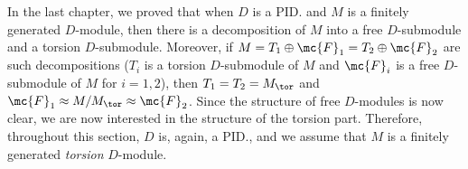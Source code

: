 In the last chapter, we proved that when $D$ is a PID. and $M$ is a finitely generated $D$-module, then there is a decomposition of $M$ into a free $D$-submodule and a torsion $D$-submodule.
Moreover, if $M=T_1\oplus\mc{F}_1=T_2\oplus\mc{F}_2$ are such decompositions ($T_i$ is a torsion $D$-submodule of $M$ and $\mc{F}_i$ is a free $D$-submodule of $M$ for $i=1, 2$), then $T_1=T_2=M_\tor$ and $\mc{F}_1\approx M/M_\tor\approx \mc{F}_2$.
Since the structure of free $D$-modules is now clear, we are now interested in the structure of the torsion part.
Therefore, throughout this section, $D$ is, again, a PID., and we assume that $M$ is a finitely generated \textit{torsion} $D$-module.